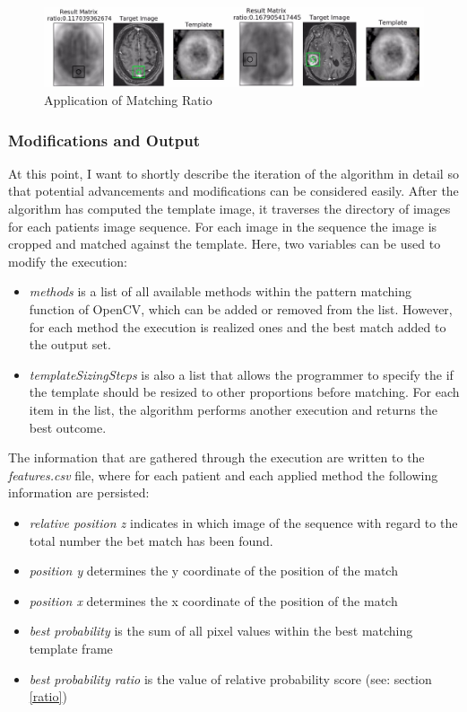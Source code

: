 \documentclass[twoside,11pt]{article}
\begin{document}
	\begin{figure}
		\label{fig:ratio}
		\centering
		\includegraphics[width=14cm]{ratio}
		\caption{Application of Matching Ratio}
	\end{figure}%
	
	\subsubsection{Modifications and Output}
	\label{modifications}
	At this point, I want to shortly describe the iteration of the algorithm in detail so that potential advancements and modifications can be considered easily. After the algorithm has computed the template image, it traverses the directory of images for each patients image sequence. For each image in the sequence the image is cropped and matched against the template. Here, two variables can be used to modify the execution:
	\begin{itemize}
		\item \textit{methods} is a list of all available methods within the pattern matching function of OpenCV, which can be added or removed from the list. However, for each method the execution is realized ones and the best match added to the output set.
		\item \textit{templateSizingSteps} is also a list that allows the programmer to specify the if the template should be resized to other proportions before matching. For each item in the list, the algorithm performs another execution and returns the best outcome.
	\end{itemize}
	
	The information that are gathered through the execution are written to the \textit{features.csv} file, where for each patient and each applied method the following information are persisted:
	
	\begin{itemize}
		\item \textit{relative position z} indicates in which image of the sequence with regard to the total number the bet match has been found.
		\item \textit{position y} determines the y coordinate of the position of the match
		\item \textit{position x} determines the x coordinate of the position of the match
		\item \textit{best probability} is the sum of all pixel values within the best matching template frame
		\item \textit{best probability ratio} is the value of relative probability score (see: section \ref{ratio}) 
	\end{itemize}
	
\end{document}
